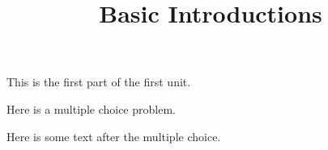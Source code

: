\documentclass{ximera}
\title{Basic Introductions}
\begin{document}
This is the first part of the first unit.

\begin{exercise}
  Here is a multiple choice problem.
    \begin{multipleChoice}
    \end{multipleChoice}

  Here is some text after the multiple choice.
\end{exercise}
\end{document}
